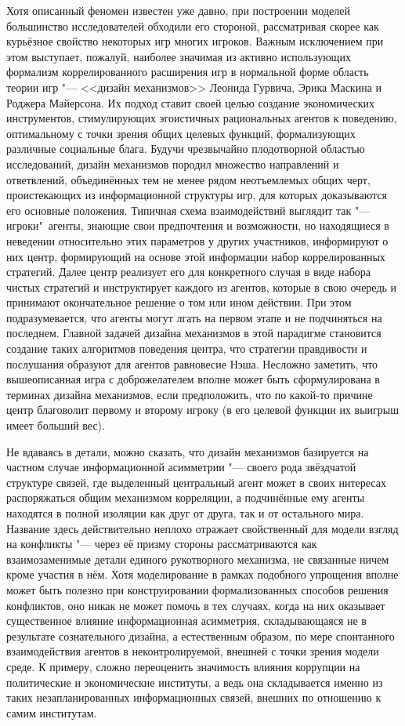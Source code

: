 Хотя описанный феномен известен уже давно, при построении моделей большинство исследователей обходили его стороной, рассматривая скорее как курьёзное свойство некоторых игр многих игроков. Важным исключением при этом выступает, пожалуй, наиболее значимая из активно использующих формализм коррелированного расширения игр в нормальной форме область теории игр "--- <<дизайн механизмов>> \cite{Nikolenko} Леонида Гурвича, Эрика Маскина и Роджера Майерсона. Их подход ставит своей целью создание экономических инструментов, стимулирующих эгоистичных рациональных агентов к поведению, оптимальному с точки зрения общих целевых функций, формализующих различные социальные блага. Будучи чрезвычайно плодотворной областью исследований, дизайн механизмов породил множество направлений и ответвлений, объединённых тем не менее рядом неотъемлемых общих черт, проистекающих из информационной структуры игр, для которых доказываются его основные положения. Типичная схема взаимодействий выглядит так "--- игроки"~агенты, знающие свои предпочтения и возможности, но находящиеся в неведении относительно этих параметров у других участников, информируют о них центр, формирующий на основе этой информации набор коррелированных стратегий. Далее центр реализует его для конкретного случая в виде набора чистых стратегий и инструктирует каждого из агентов, которые в свою очередь и принимают окончательное решение о том или ином действии. При этом подразумевается, что агенты могут лгать на первом этапе и не подчиняться на последнем. Главной задачей дизайна механизмов в этой парадигме становится создание таких алгоритмов поведения центра, что стратегии правдивости и послушания образуют для агентов равновесие Нэша. Несложно заметить, что вышеописанная игра с доброжелателем вполне может быть сформулирована в терминах дизайна механизмов, если предположить, что по какой-то причине центр благоволит первому и второму игроку (в его целевой функции их выигрыш имеет больший вес).

Не вдаваясь в детали, можно сказать, что дизайн механизмов базируется на частном случае информационной асимметрии "--- своего рода звёздчатой структуре связей, где выделенный центральный агент может в своих интересах распоряжаться общим механизмом корреляции, а подчинённые ему агенты находятся в полной изоляции как друг от друга, так и от остального мира. Название здесь действительно неплохо отражает свойственный для модели взгляд на конфликты "--- через её призму стороны рассматриваются как взаимозаменимые детали единого рукотворного механизма, не связанные ничем кроме участия в нём. Хотя моделирование в рамках подобного упрощения вполне может быть полезно при конструировании формализованных способов решения конфликтов, оно никак не может помочь в тех случаях, когда на них оказывает существенное влияние информационная асимметрия, складывающаяся не в результате сознательного дизайна, а естественным образом, по мере спонтанного взаимодействия агентов в неконтролируемой, внешней с точки зрения модели среде. К примеру, сложно переоценить значимость влияния коррупции на политические и экономические институты, а ведь она складывается именно из таких незапланированных информационных связей, внешних по отношению к самим институтам.

